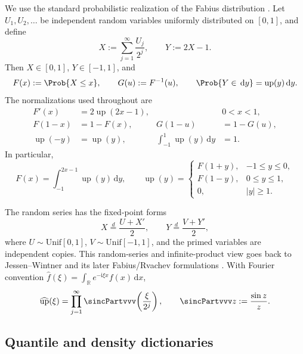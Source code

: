 \documentclass[11pt,oneside]{article}
\theoremstyle{definition}
\theoremstyle{remark}
\newcommand{\Up}{\operatorname{up}}
\newcommand{\R}{\mathbb R}
\newcommand{\dd}{\,\mathrm d}
\newcommand{\ii}{\mathrm i}
\newcommand{\1}{\mathbf 1}
\begin{document}
We use the standard probabilistic realization of the Fabius distribution
\cite{p11:Fabius1966,p11:arias1982}.  Let $U_1,U_2,\ldots$ be independent random
variables uniformly distributed on $[0,1]$, and define
\begin{equation}
 X:=\sum_{j=1}^{\infty}\frac{U_j}{2^j},
 \qquad
 Y:=2X-1.
 \label{p11:eq:X-Y-def}
\end{equation}
Then $X\in[0,1]$, $Y\in[-1,1]$, and
\begin{equation}
 F(x):=\Prob\{X\le x\},
 \qquad
 G(u):=F^{-1}(u),
 \qquad
 \Prob\{Y\in\dd y\}=\Up(y)\dd y.
\end{equation}
The normalizations used throughout are
\begin{align}
 F'(x)&=2\Up(2x-1), &&0<x<1, \label{p11:eq:density-relation}\\
 F(1-x)&=1-F(x), &
 G(1-u)&=1-G(u), \label{p11:eq:symmetry-FG}\\
 \Up(-y)&=\Up(y), &
 \int_{-1}^{1}\Up(y)\dd y&=1. \label{p11:eq:up-symmetry}
\end{align}
In particular,
\begin{equation}
 F(x)=\int_{-1}^{2x-1}\Up(y)\dd y,
 \qquad
 \Up(y)=
 \begin{cases}
 F(1+y),&-1\le y\le0,\\
 F(1-y),&0\le y\le1,\\
 0,&|y|\ge1.
 \end{cases}
 \label{p11:eq:F-up-dictionary}
\end{equation}

The random series has the fixed-point forms
\begin{equation}
 X\overset d=\frac{U+X'}2,
 \qquad
 Y\overset d=\frac{V+Y'}2,
 \label{p11:eq:fixed-points}
\end{equation}
where $U\sim\mathrm{Unif}[0,1]$, $V\sim\mathrm{Unif}[-1,1]$, and the primed
variables are independent copies.  This random-series and infinite-product
view goes back to Jessen--Wintner and its later Fabius/Rvachev formulations
\cite{p11:JessenWintner,p11:Fabius1966,p11:arias1982}.  With Fourier convention
$\widehat f(\xi)=\int_{\R}e^{-\ii\xi x}f(x)\dd x$,
\begin{equation}
 \widehat{\Up}(\xi)
 =\prod_{j=1}^{\infty}\sincPartvvv\!\left(\frac{\xi}{2^j}\right),
 \qquad \sincPartvvv z:=\frac{\sin z}{z}.
 \label{p11:eq:up-fourier-product}
\end{equation}

\subsection{Quantile and density dictionaries}
\end{document}
